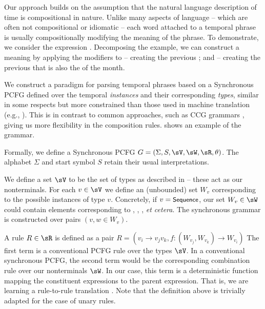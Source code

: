Our approach builds on the assumption that the natural language description
	of time is compositional in nature.
Unlike many aspects of language  -- which are often not compositional or
	idiomatic -- each word attached to a temporal phrase is 
	usually compositionally modifying the meaning of the phrase.
To demonstrate, we consider the expression .
Decomposing the example, we can construct a meaning by 
	applying the modifiers  to  -- 
	creating the previous ;
	and  -- creating the previous  that is
	also the  of the month.

We construct a paradigm for parsing temporal phrases based on a Synchronous
	PCFG defined over the temporal \textit{instances} and their
	corresponding \textit{types}, similar in some respects but more
	constrained than those used in machine translation 
	(e.g., ).
This is in contrast to common approaches, such as CCG grammars 
	\cite{key:2000steedman-ccg,key:2004bos-ccg,2011kwiatkowski-semantics},
	giving us more flexibility in the composition rules.
 shows an example of the grammar.

Formally, we define a Synchronous PCFG 
	$G = \left(\Sigma,S,\sV,\sW,\sR,\theta\right)$.
The alphabet $\Sigma$ and start symbol $S$ retain their usual interpretations.

We define a set $\sV$ to be the set of types as described in
	 -- these act as our nonterminals.
For each $v \in \sV$ we define an (unbounded) set $W_v$ corresponding to the 
	possible instances of type $v$.
Concretely, if $v=\textsf{\small{Sequence}}$, our set $W_v \in \sW$ could contain elements
	corresponding to , , ,
	\textit{et cetera}.
The synchronous grammar is constructed over pairs $(v,w \in W_v)$.

A rule $R \in \sR$ is defined as a pair 
	$R = \left(v_i \rightarrow v_jv_k, 
		f : (W_{v_j},W_{v_k}) \rightarrow W_{v_i}\right)$
The first term is a conventional PCFG rule over the types
	$\sV$.
In a conventional synchronous PCFG, the second term would be the corresponding
	combination rule over our nonterminals $\sW$.
In our case, this term is a deterministic function mapping the
	constituent expressions to the parent expression.
That is, we are learning a rule-to-rule translation 
	\cite{key:1976bach-semantics}.
Note that the definition above is trivially adapted for the case of unary
	rules.

